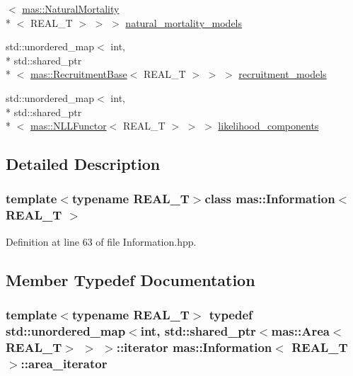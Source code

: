 \begin{DoxyCompactItemize}
$<$ \hyperlink{structmas_1_1_natural_mortality}{mas\-::\-Natural\-Mortality}\\*
$<$ R\-E\-A\-L\-\_\-\-T $>$ $>$ $>$ \hyperlink{classmas_1_1_information_acf9c6846c98a230ec902d85e3ee3b5c8}{natural\-\_\-mortality\-\_\-models}
\item 
std\-::unordered\-\_\-map$<$ int, \\*
std\-::shared\-\_\-ptr\\*
$<$ \hyperlink{structmas_1_1_recruitment_base}{mas\-::\-Recruitment\-Base}$<$ R\-E\-A\-L\-\_\-\-T $>$ $>$ $>$ \hyperlink{classmas_1_1_information_ad540badf665ee856a5de0e4da0bb2e5e}{recruitment\-\_\-models}
\item 
std\-::unordered\-\_\-map$<$ int, \\*
std\-::shared\-\_\-ptr\\*
$<$ \hyperlink{structmas_1_1_n_l_l_functor}{mas\-::\-N\-L\-L\-Functor}$<$ R\-E\-A\-L\-\_\-\-T $>$ $>$ $>$ \hyperlink{classmas_1_1_information_aa58693a25eea57a0080bb4b99515fc23}{likelihood\-\_\-components}
\end{DoxyCompactItemize}


\subsection{Detailed Description}
\subsubsection*{template$<$typename R\-E\-A\-L\-\_\-\-T$>$class mas\-::\-Information$<$ R\-E\-A\-L\-\_\-\-T $>$}



Definition at line 63 of file Information.\-hpp.



\subsection{Member Typedef Documentation}
\hypertarget{classmas_1_1_information_a6183f0d8819e3ecb50239da88d2cfdb3}{
\subsubsection[{area\-\_\-iterator}]{\setlength{\rightskip}{0pt plus 5cm}template$<$typename R\-E\-A\-L\-\_\-\-T$>$ typedef std\-::unordered\-\_\-map$<$int, std\-::shared\-\_\-ptr$<${\bf mas\-::\-Area}$<$R\-E\-A\-L\-\_\-\-T$>$ $>$ $>$\-::iterator {\bf mas\-::\-Information}$<$ R\-E\-A\-L\-\_\-\-T $>$\-::{\bf area\-\_\-iterator}}}\label{classmas_1_1_information_a6183f0d8819e3ecb50239da88d2cfdb3}


